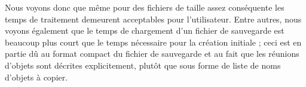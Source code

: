 \documentclass[11pt,a4paper]{article}
\begin{document}
	Nous voyons donc que même pour des fichiers de taille assez conséquente les temps de traitement demeurent acceptables pour l'utilisateur. Entre autres, nous voyons également que le temps de chargement d'un fichier de sauvegarde est beaucoup plus court que le temps nécessaire pour la création initiale ; ceci est en partie dû au format compact du fichier de sauvegarde et au fait que les réunions d'objets sont décrites explicitement, plutôt que sous forme de liste de noms d'objets à copier.
	
\end{document}
